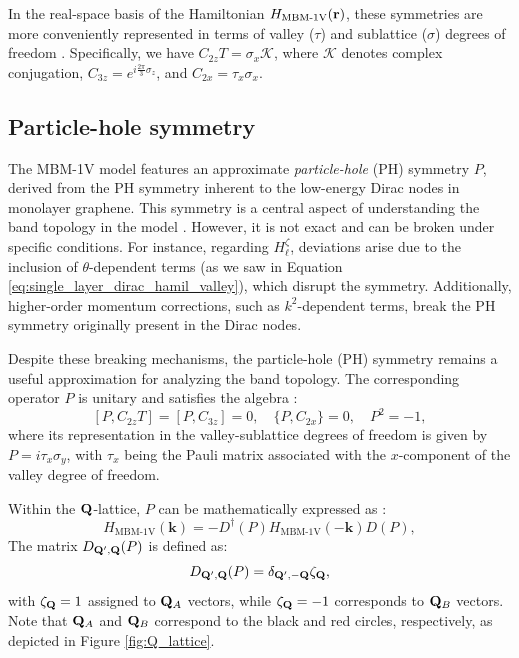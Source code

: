 In the real-space basis of the Hamiltonian \( H_{\text{MBM-1V}}({\vb{r}}) \), these symmetries are more conveniently represented in terms of valley (\( \tau \)) and sublattice (\( \sigma \)) degrees of freedom \cite{bernevig_II_2021}. Specifically, we have \( C_{2z}T = \sigma_x \mathcal{K} \), where \( \mathcal{K} \) denotes complex conjugation, \( C_{3z} = e^{i\frac{2\pi}{3} \sigma_z} \), and \( C_{2x} = \tau_x \sigma_x \).


\subsection{Particle-hole symmetry} \label{subsec:ph_symmetry}

The MBM-1V model features an approximate \textit{particle-hole} (PH) symmetry $P$, derived from the PH symmetry inherent to the low-energy Dirac nodes in monolayer graphene.  This symmetry is a central aspect of understanding the band topology in the model \cite{all_magic_angles}. However, it is not exact and can be broken under specific conditions. For instance, regarding \( H_{\ell}^\zeta \), deviations arise due to the inclusion of \(\theta\)-dependent terms (as we saw in Equation \ref{eq:single_layer_dirac_hamil_valley}), which disrupt the symmetry. Additionally, higher-order momentum corrections, such as \( k^2 \)-dependent terms, break the PH symmetry originally present in the Dirac nodes.

Despite these breaking mechanisms, the particle-hole (PH) symmetry remains a useful approximation for analyzing the band topology. The corresponding operator \( P \) is unitary and satisfies the algebra \cite{bernevig_II_2021}:
\begin{equation} \label{eq:PH_symmetry_algebra}
[P, C_{2z}T] = [P, C_{3z}] = 0, \quad \{P, C_{2x}\} = 0, \quad P^2 = -1,
\end{equation}
where its representation in the valley-sublattice degrees of freedom is given by \( P = i \tau_x \sigma_y \), with \( \tau_x \) being the Pauli matrix associated with the \( x \)-component of the valley degree of freedom.

Within the ${\vb{Q}}$-lattice, $P$ can be mathematically expressed as \cite{all_magic_angles}:
\begin{equation} \label{eq:ph_symmetry_hamiltonian}
H_{\text{MBM-1V}}(\mathbf{k}) = -D^\dagger(P) H_{\text{MBM-1V}}(-\mathbf{k}) D(P),
\end{equation}
The matrix \( D_{{\vb{Q}}',{\vb{Q}}}(P) \) is defined as:
\begin{equation} \label{eq:D(P)_Q_lattice_PH_symmetry}
D_{{\vb{Q}}',{\vb{Q}}}(P) = \delta_{{\vb{Q}}',-{\vb{Q}}} \zeta_{\vb{Q}},
\end{equation}
with \( \zeta_{\vb{Q}} = 1 \) assigned to \( {\vb{Q}}_A \) vectors, while \( \zeta_{\vb{Q}} = -1 \) corresponds to \( {\vb{Q}}_B \) vectors. Note that \( {\vb{Q}}_A \) and \( {\vb{Q}}_B \) correspond to the black and red circles, respectively, as depicted in Figure \ref{fig:Q_lattice}.

